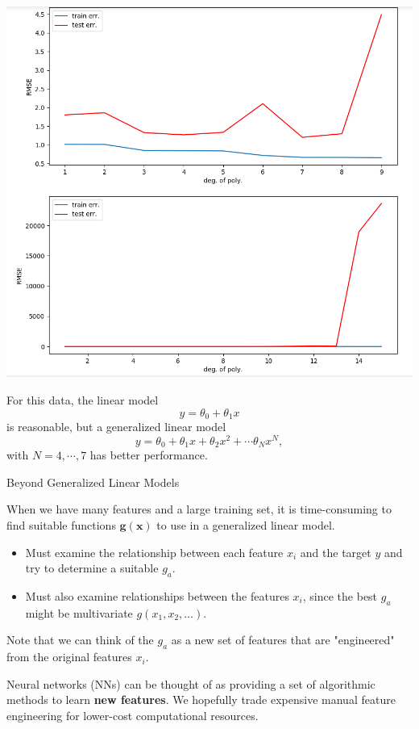 \documentclass[12pt,t]{beamer}
\begin{document}
\begin{frame}

\centerline{
\includegraphics[height=1\textheight]{./images/biasvsvariance_error.png}
} 

\end{frame}

\begin{frame}

For this data, the linear model
$$ y = \theta_0 +  \theta_1 x$$
is reasonable, but a generalized linear model 
$$ y = \theta_0 +  \theta_1 x + \theta_2 x^2 + \cdots \theta_N x^N, $$
with $ N = 4, \cdots, 7$ has better performance.

\end{frame}

\begin{frame}{Beyond Generalized Linear Models}

 When  we have many features and a large training set, it is time-consuming to find suitable functions $ \bm{g}( \mathbf{x} )$ to use in a generalized linear model.

\begin{itemize}
\item Must examine the relationship between each feature $x_i$ and the target $y$ and try to determine a suitable $g_a$.
\item Must also examine relationships between the features $x_i$, since the best $g_a$ might be multivariate $g(x_1, x_2,\ldots)$.
\end{itemize}

Note that we can think of the $g_a$ as a new set of features that are "engineered" from the original features $x_i$.

\bigskip
Neural networks (NNs) can be thought of as providing a set of algorithmic methods to learn {\bf new features}.  We hopefully trade expensive manual feature engineering for lower-cost computational  resources. 
\end{frame}
\end{document}

